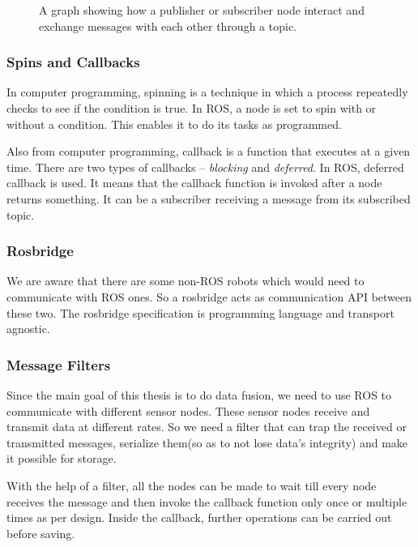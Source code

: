 \begin{figure}[h]
    \centering
    \def\svgwidth{0.9\textwidth}
    
    \caption{A graph showing how a publisher or subscriber node interact and exchange
    messages with each other through a topic.}
    \label{fig:rosgraph}
\end{figure}

\subsubsection*{Spins and Callbacks}
In computer programming, spinning is a technique in which a process repeatedly checks to
see if the condition is true. In ROS, a node is set to spin with or without a condition. This
enables it to do its tasks as programmed.

Also from computer programming, callback is a function that executes at a given time.
There are two types of callbacks -- \textit{blocking} and \textit{deferred}. In ROS,
deferred callback is used. It means that the callback function is invoked after a node
returns something. It can be a subscriber receiving a message from its subscribed topic.

\subsubsection*{Rosbridge}
We are aware that there are some non-ROS robots which would need to communicate with ROS
ones. So a rosbridge \cite{rosbridge} acts as communication API between these two. The rosbridge
specification is programming language and transport agnostic.

\subsubsection*{Message Filters}
Since the main goal of this thesis is to do data fusion, we need to use ROS to communicate
with different sensor nodes. These sensor nodes receive and transmit data at different rates.
So we need a filter that can trap the received or transmitted messages, serialize them(so
as to not lose data's integrity) and make it possible for storage.

With the help of a filter, all the nodes can be made to wait till every node receives the message and then
invoke the callback function only once or multiple times as per design. Inside the callback, further operations can be
carried out before saving.

